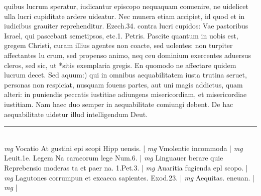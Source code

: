 \documentclass{article}
\begin{document}
\begin{pages}
quibus lucrum speratur, iudicantur episcopo nequaquam conuenire, ne uidelicet ulla lucri cupiditate ardere uideatur. Nec munera etiam accipiet, id quod et in iudicibus grauiter reprehenditur. Ezech.34. contra lucri cupidos: Vae pastoribus Israel, qui pascebant semetipsos, etc.1. Petris. Pascite quantum in uobis est, gregem Christi, curam illius agentes non coacte, sed uolentes: non turpiter affectantes lu crum, sed propenso animo, neq ceu dominium exercentes aduersus cleros, sed sic, ut *sitis exemplaria gregis. En quomodo ne affectare quidem lucrum decet.  \pend\pstart Sed aquum:) qui in omnibus aequabilitatem iusta trutina seruet, personas non respiciat, nusquam fouens partes, aut uni magis addictus, quam alteri: in puniendis peccatis iustitiae adiungens misericordiam, et misericordiae iustitiam. Nam haec duo semper in aequabilitate comiungi debent. De hac aequabilitate uidetur illud intelligendum Deut.  \pend
\vspace{0.5cm}\noindent
\vspace{0.2cm}\rule{1cm}{0.2pt}\\ 
\hspace{0.2cm}\textit{mg}
\footnotesize Vocatio At gustini epi scopi Hipp uensis. 
\normalsize| 
\hspace{0.2cm}\textit{mg}
\footnotesize Vmolentie incommoda 
\normalsize| 
\hspace{0.2cm}\textit{mg}
\footnotesize Leuit.1e. Legem Na caraeorum lege Num.6. 
\normalsize| 
\hspace{0.2cm}\textit{mg}
\footnotesize Linguauer berare quie Reprebensio moderas ta et paer na. 1.Pet.3. 
\normalsize| 
\hspace{0.2cm}\textit{mg}
\footnotesize Auaritia fugienda epl scopo. 
\normalsize| 
\hspace{0.2cm}\textit{mg}
\footnotesize Lagutones corrumpun et excaeca sapientes. Exod.23. 
\normalsize| 
\hspace{0.2cm}\textit{mg}
\footnotesize Aequitas. eneuan. 
\normalsize| 
\hspace{0.2cm}\textit{mg}
\footnotesize 
\normalsize| 

\end{pages}
\end{document}
